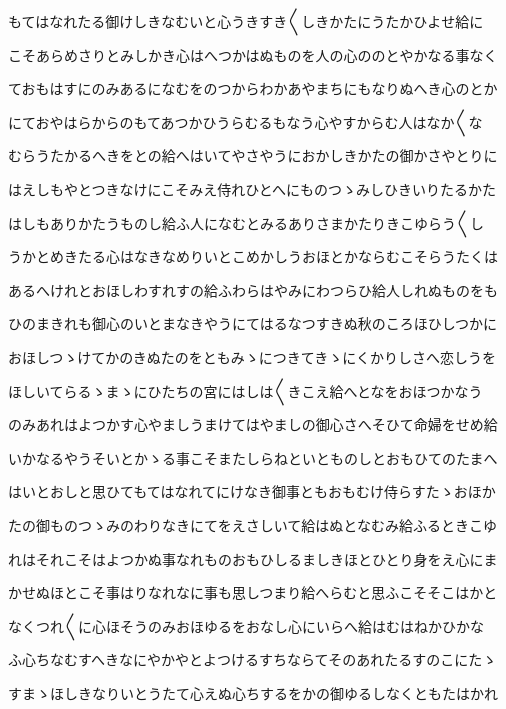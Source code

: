 \documentclass[a4paper,11pt,landscape]{ltjtarticle}
\begin{document}
\par\medskip
もてはなれたる御けしきなむいと心うきすき〱しきかたにうたかひよせ給に
\par\medskip
こそあらめさりとみしかき心はへつかはぬものを人の心ののとやかなる事なく
\par\medskip
ておもはすにのみあるになむをのつからわかあやまちにもなりぬへき心のとか
\par\medskip
にておやはらからのもてあつかひうらむるもなう心やすからむ人はなか〱な
\par\medskip
むらうたかるへきをとの給へはいてやさやうにおかしきかたの御かさやとりに
\par\medskip
はえしもやとつきなけにこそみえ侍れひとへにものつゝみしひきいりたるかた
\par\medskip
はしもありかたうものし給ふ人になむとみるありさまかたりきこゆらう〱し
\par\medskip
うかとめきたる心はなきなめりいとこめかしうおほとかならむこそらうたくは
\par\medskip
あるへけれとおほしわすれすの給ふわらはやみにわつらひ給人しれぬものをも
\par\medskip
ひのまきれも御心のいとまなきやうにてはるなつすきぬ秋のころほひしつかに
\par\medskip
おほしつゝけてかのきぬたのをともみゝにつきてきゝにくかりしさへ恋しうを
\par\medskip
ほしいてらるゝまゝにひたちの宮にはしは〱きこえ給へとなをおほつかなう
\par\medskip
のみあれはよつかす心やましうまけてはやましの御心さへそひて命婦をせめ給
\par\medskip
いかなるやうそいとかゝる事こそまたしらねといとものしとおもひてのたまへ
\par\medskip
はいとおしと思ひてもてはなれてにけなき御事ともおもむけ侍らすたゝおほか
\par\medskip
たの御ものつゝみのわりなきにてをえさしいて給はぬとなむみ給ふるときこゆ
\par\medskip
れはそれこそはよつかぬ事なれものおもひしるましきほとひとり身をえ心にま
\par\medskip
かせぬほとこそ事はりなれなに事も思しつまり給へらむと思ふこそそこはかと
\par\medskip
なくつれ〱に心ほそうのみおほゆるをおなし心にいらへ給はむはねかひかな
\par\medskip
ふ心ちなむすへきなにやかやとよつけるすちならてそのあれたるすのこにたゝ
\par\medskip
すまゝほしきなりいとうたて心えぬ心ちするをかの御ゆるしなくともたはかれ
\par\medskip
\end{document}
